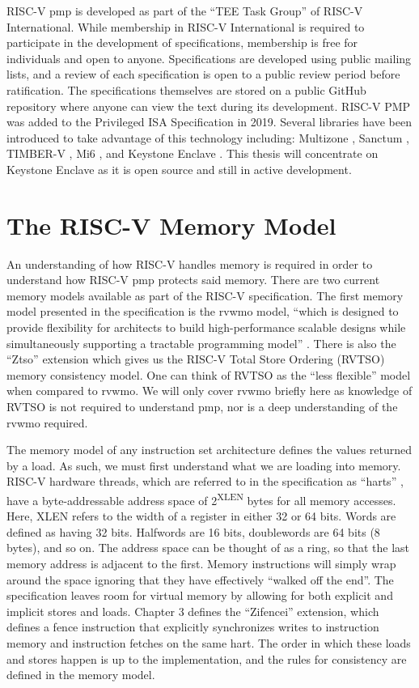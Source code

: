 RISC-V \gls{pmp} is developed as part of the ``TEE Task Group'' of RISC-V International. While membership in RISC-V International is required to participate in the development of specifications, membership is free for individuals and open to anyone. Specifications are developed using public mailing lists, and a review of each specification is open to a public review period before ratification. The specifications themselves are stored on a public GitHub repository where anyone can view the text during its development. RISC-V PMP was added to the Privileged ISA Specification \cite{PrivIsa2019} in 2019. Several libraries have been introduced to take advantage of this technology including: Multizone \cite{pinto2019industry}, Sanctum \cite{Costan2016a}, TIMBER-V \cite{weiser2019timber}, Mi6 \cite{bourgeat2019mi6}, and Keystone Enclave \cite{lee2019keystone, lee2020keystone, cheangverifying}. This thesis will concentrate on Keystone Enclave as it is open source and still in active development.

\section{The RISC-V Memory Model}
An understanding of how RISC-V handles memory is required in order to understand how RISC-V \gls{pmp} protects said memory. There are two current memory models available as part of the RISC-V specification. The first memory model presented in the specification is the \gls{rvwmo} model, ``which is designed to provide flexibility for architects to build high-performance scalable designs while simultaneously supporting a tractable programming model'' \cite{UnprivIsa2019}. There is also the ``Ztso'' extension which gives us the RISC-V Total Store Ordering (RVTSO) memory consistency model. One can think of RVTSO as the ``less flexible'' model when compared to \gls{rvwmo}. We will only cover \gls{rvwmo} briefly here as knowledge of RVTSO is not required to understand \gls{pmp}, nor is a deep understanding of the \gls{rvwmo} required.

The memory model of any instruction set architecture defines the values returned by a load. As such, we must first understand what we are loading into memory. RISC-V hardware threads, which are referred to in the specification as ``\glspl{hart}'' \cite{UnprivIsa2019}, have a byte-addressable address space of 2\textsuperscript{XLEN} bytes for all memory accesses. Here, XLEN refers to the width of a register in either 32 or 64 bits. Words are defined as having 32 bits. Halfwords are 16 bits, doublewords are 64 bits (8 bytes), and so on. The address space can be thought of as a ring, so that the last memory address is adjacent to the first. Memory instructions will simply wrap around the space ignoring that they have effectively ``walked off the end''. The specification leaves room for virtual memory by allowing for both explicit and implicit stores and loads. Chapter 3 defines the ``Zifencei'' extension, which defines a fence instruction that explicitly synchronizes writes to instruction memory and instruction fetches on the same \gls{hart}. The order in which these loads and stores happen is up to the implementation, and the rules for consistency are defined in the memory model.


